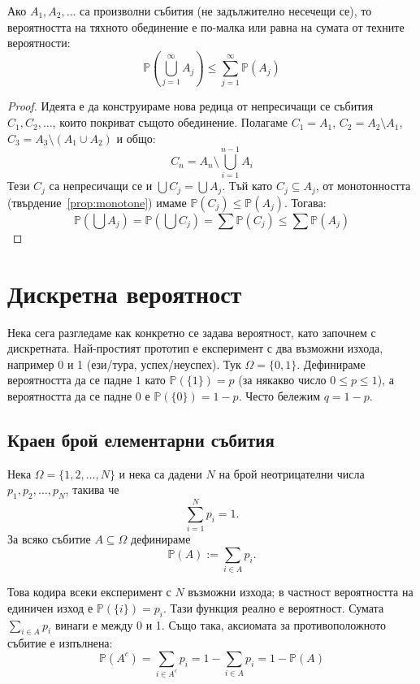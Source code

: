 \begin{prop}\label{prop:subadd}
Ако $A_1, A_2, \dots$ са произволни събития (не задължително несечещи се), то вероятността на тяхното обединение е по-малка или равна на сумата от техните вероятности:
\[ \mathbb{P}\left(\bigcup_{j=1}^{\infty} A_j\right) \le \sum_{j=1}^{\infty} \mathbb{P}(A_j) \]
\end{prop}
\begin{proof}
Идеята е да конструираме нова редица от непресичащи се събития $C_1, C_2, \dots$, които покриват същото обединение. Полагаме $C_1 = A_1$, $C_2 = A_2 \setminus A_1$, $C_3 = A_3 \setminus (A_1 \cup A_2)$ и общо:
\[ C_n = A_n \setminus \bigcup_{i=1}^{n-1} A_i \]
Тези $C_j$ са непресичащи се и $\bigcup C_j = \bigcup A_j$. Тъй като $C_j \subseteq A_j$, от монотонността (твърдение~\ref{prop:monotone}) имаме $\mathbb{P}(C_j) \le \mathbb{P}(A_j)$. Тогава:
\[ \mathbb{P}\left(\bigcup A_j\right) = \mathbb{P}\left(\bigcup C_j\right) = \sum \mathbb{P}(C_j) \le \sum \mathbb{P}(A_j) \]
\end{proof}

\section{Дискретна вероятност}

Нека сега разгледаме как конкретно се задава вероятност, като започнем с дискретната.
Най-простият прототип е експеримент с два възможни изхода, например 0 и 1 (ези/тура, успех/неуспех).
Тук $\Omega = \{0, 1\}$. Дефинираме вероятността да се падне $1$ като $\mathbb{P}(\{1\}) = p$ (за някакво число $0 \le p \le 1$), а вероятността да се падне $0$ е $\mathbb{P}(\{0\}) = 1 - p$. Често бележим $q = 1 - p$.

\subsection{Краен брой елементарни събития}

\begin{defn}\label{def:discrete}
Нека $\Omega = \{1, 2, \dots, N\}$ и нека са дадени $N$ на брой неотрицателни числа $p_1, p_2, \dots, p_N$, такива че
\[ \sum_{i=1}^N p_i = 1. \]
За всяко събитие $A \subseteq \Omega$ дефинираме
\[ \mathbb{P}(A) := \sum_{i \in A} p_i . \]
\end{defn}

Това кодира всеки експеримент с $N$ възможни изхода; в частност вероятността на единичен изход е $\mathbb{P}(\{i\}) = p_i$.
Тази функция реално е вероятност. Сумата $\sum_{i \in A} p_i$ винаги е между 0 и 1. Също така, аксиомата за противоположното събитие е изпълнена:
\[ \mathbb{P}(A^c) = \sum_{i \in A^c} p_i = 1 - \sum_{i \in A} p_i = 1 - \mathbb{P}(A) \]

